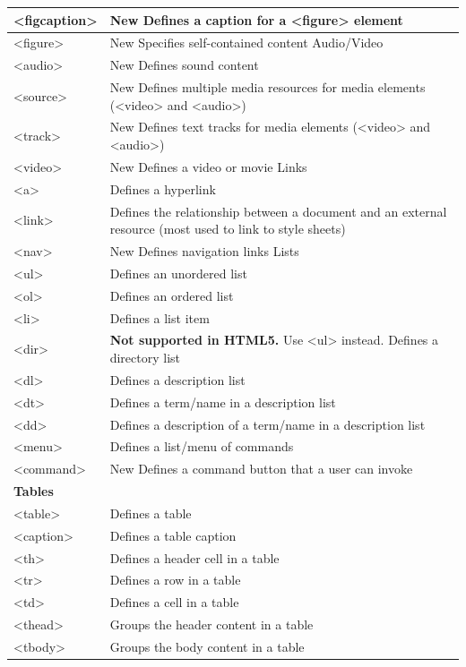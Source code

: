 \documentclass[a4paper,oneside]{book}
\begin{document}
\begin{longtable}[H]{| p{5cm} | p{10cm} |}
<figcaption> & New	Defines a caption for a <figure> element \\ \hline 
<figure>	& New	Specifies self-contained content
Audio/Video	  \\ \hline 
<audio>	& New	Defines sound content \\ \hline 
<source>	& New	Defines multiple media resources for media elements (<video> and <audio>) \\ \hline 
<track>	& New	Defines text tracks for media elements (<video> and <audio>) \\ \hline 
<video>	& New	Defines a video or movie
Links	  \\ \hline 
<a>		& Defines a hyperlink \\ \hline 
<link>		& Defines the relationship between a document and an external resource (most used to link to style sheets) \\ \hline 
<nav>	& New	Defines navigation links
Lists	 \\ \hline 
<ul>		& Defines an unordered list \\ \hline 
<ol>		& Defines an ordered list \\ \hline 
<li>		& Defines a list item \\ \hline 
<dir>		& \textbf{Not supported in HTML5.} Use <ul> instead.
Defines a directory list \\ \hline 
<dl> & Defines a description list \\ \hline 
<dt> & 	Defines a term/name in a description list \\ \hline 
<dd> & 	Defines a description of a term/name in a description list \\ \hline 
<menu> & 	Defines a list/menu of commands \\ \hline 
<command> & New	Defines a command button that a user can invoke \\ \hline 
\multicolumn{2}{|l|}{\textbf{Tables}}	 \\ \hline 
<table>	 & Defines a table \\ \hline 
<caption> & 	Defines a table caption \\ \hline 
<th>	 & Defines a header cell in a table \\ \hline 
<tr> & 	Defines a row in a table \\ \hline 
<td> & 	Defines a cell in a table \\ \hline 
<thead> & 	Groups the header content in a table \\ \hline 
<tbody>	 & Groups the body content in a table \\ \hline 

\end{longtable}
\end{document}
